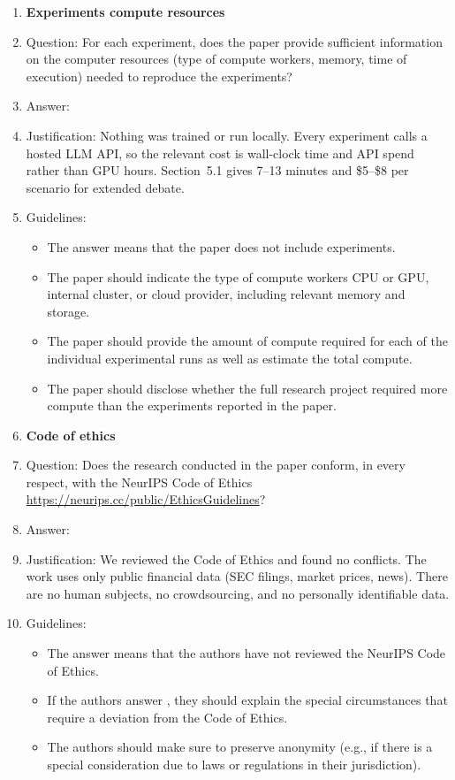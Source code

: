 \begin{enumerate}
\item {\bf Experiments compute resources}
    \item[] Question: For each experiment, does the paper provide sufficient information on the computer resources (type of compute workers, memory, time of execution) needed to reproduce the experiments?
    \item[] Answer: \answerYes{}
    \item[] Justification: Nothing was trained or run locally. Every experiment calls a hosted LLM API, so the relevant cost is wall-clock time and API spend rather than GPU hours. Section~5.1 gives 7--13 minutes and \$5--\$8 per scenario for extended debate.
    \item[] Guidelines:
    \begin{itemize}
        \item The answer \answerNA{} means that the paper does not include experiments.
        \item The paper should indicate the type of compute workers CPU or GPU, internal cluster, or cloud provider, including relevant memory and storage.
        \item The paper should provide the amount of compute required for each of the individual experimental runs as well as estimate the total compute.
        \item The paper should disclose whether the full research project required more compute than the experiments reported in the paper.
    \end{itemize}

\item {\bf Code of ethics}
    \item[] Question: Does the research conducted in the paper conform, in every respect, with the NeurIPS Code of Ethics \url{https://neurips.cc/public/EthicsGuidelines}?
    \item[] Answer: \answerYes{}
    \item[] Justification: We reviewed the Code of Ethics and found no conflicts. The work uses only public financial data (SEC filings, market prices, news). There are no human subjects, no crowdsourcing, and no personally identifiable data.
    \item[] Guidelines:
    \begin{itemize}
        \item The answer \answerNA{} means that the authors have not reviewed the NeurIPS Code of Ethics.
        \item If the authors answer \answerNo, they should explain the special circumstances that require a deviation from the Code of Ethics.
        \item The authors should make sure to preserve anonymity (e.g., if there is a special consideration due to laws or regulations in their jurisdiction).
    \end{itemize}


\end{enumerate}
